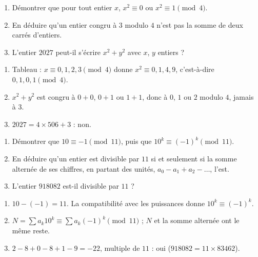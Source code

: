 \begin{exercise}
\begin{enumerate}
\item Démontrer que pour tout entier $x$, $x^2\equiv0$ ou $x^2\equiv1\pmod4$.
\item En déduire qu'un entier congru à $3$ modulo $4$ n'est pas la somme de deux carrés d'entiers.
\item L'entier $\num{2027}$ peut-il s'écrire $x^2+y^2$ avec $x$, $y$ entiers ?
\end{enumerate}
\end{exercise}
\begin{solution}
\begin{enumerate}
\item Tableau : $x\equiv0,1,2,3\pmod4$ donne $x^2\equiv0,1,4,9$, c'est-à-dire $0,1,0,1\pmod4$.
\item $x^2+y^2$ est congru à $0+0$, $0+1$ ou $1+1$, donc à $0$, $1$ ou $2$ modulo $4$, jamais à $3$.
\item $\num{2027}=4\times506+3$ : non.
\end{enumerate}
\end{solution}

\begin{exercise}
\begin{enumerate}
\item Démontrer que $10\equiv-1\pmod{11}$, puis que $10^k\equiv(-1)^k\pmod{11}$.
\item En déduire qu'un entier est divisible par $11$ si et seulement si la somme alternée de ses chiffres, en partant des unités, $a_0-a_1+a_2-\dots$, l'est.
\item L'entier $\num{918082}$ est-il divisible par $11$ ?
\end{enumerate}
\end{exercise}
\begin{solution}
\begin{enumerate}
\item $10-(-1)=11$. La compatibilité avec les puissances donne $10^k\equiv(-1)^k$.
\item $N=\sum a_k10^k\equiv\sum a_k(-1)^k\pmod{11}$ ; $N$ et la somme alternée ont le même reste.
\item $2-8+0-8+1-9=-22$, multiple de $11$ : oui ($\num{918082}=11\times\num{83462}$).
\end{enumerate}
\end{solution}

